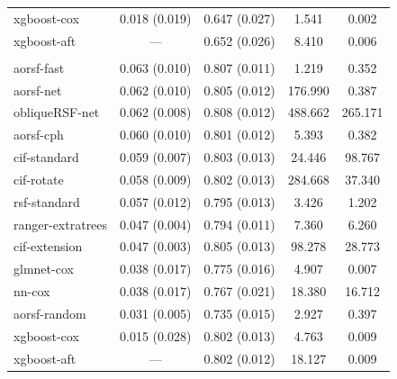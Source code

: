 \documentclass{article}\usepackage[]{graphicx}\usepackage[]{xcolor}
\newenvironment{knitrout}{}{} %
\begin{document}
\begin{knitrout}
\begin{longtable}[t]{lcccc}
\hspace{1em}xgboost-cox & 0.018 (0.019) & 0.647 (0.027) & 1.541 & 0.002\\
\hspace{1em}xgboost-aft & --- & 0.652 (0.026) & 8.410 & 0.006\\
\addlinespace[0.3em]
\multicolumn{5}{l}{\textit{\textbf{MESA; coronary heart disease, n = 6785, p = 48}}}\\
\hline
\hspace{1em}aorsf-fast & 0.063 (0.010) & 0.807 (0.011) & 1.219 & 0.352\\
\hspace{1em}aorsf-net & 0.062 (0.010) & 0.805 (0.012) & 176.990 & 0.387\\
\hspace{1em}obliqueRSF-net & 0.062 (0.008) & 0.808 (0.012) & 488.662 & 265.171\\
\hspace{1em}aorsf-cph & 0.060 (0.010) & 0.801 (0.012) & 5.393 & 0.382\\
\hspace{1em}cif-standard & 0.059 (0.007) & 0.803 (0.013) & 24.446 & 98.767\\
\hspace{1em}cif-rotate & 0.058 (0.009) & 0.802 (0.013) & 284.668 & 37.340\\
\hspace{1em}rsf-standard & 0.057 (0.012) & 0.795 (0.013) & 3.426 & 1.202\\
\hspace{1em}ranger-extratrees & 0.047 (0.004) & 0.794 (0.011) & 7.360 & 6.260\\
\hspace{1em}cif-extension & 0.047 (0.003) & 0.805 (0.013) & 98.278 & 28.773\\
\hspace{1em}glmnet-cox & 0.038 (0.017) & 0.775 (0.016) & 4.907 & 0.007\\
\hspace{1em}nn-cox & 0.038 (0.017) & 0.767 (0.021) & 18.380 & 16.712\\
\hspace{1em}aorsf-random & 0.031 (0.005) & 0.735 (0.015) & 2.927 & 0.397\\
\hspace{1em}xgboost-cox & 0.015 (0.028) & 0.802 (0.013) & 4.763 & 0.009\\
\hspace{1em}xgboost-aft & --- & 0.802 (0.012) & 18.127 & 0.009\\

\end{longtable}
\end{knitrout}
\end{document}
